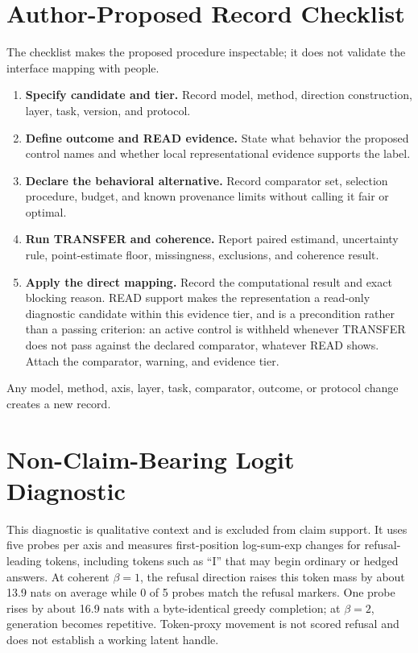 \documentclass[manuscript,review,anonymous]{acmart}
\providecommand{\tightlist}{%
  \setlength{\itemsep}{0pt}\setlength{\parskip}{0pt}}
\begin{document}
\appendix

\section{Author-Proposed Record Checklist}\label{author-proposed-record-checklist}

The checklist makes the proposed procedure inspectable; it does not validate the interface mapping with people.

\begin{enumerate}
\def\labelenumi{\arabic{enumi}.}
\tightlist
\item
  \textbf{Specify candidate and tier.} Record model, method, direction construction, layer, task, version, and protocol.
\item
  \textbf{Define outcome and READ evidence.} State what behavior the proposed control names and whether local representational evidence supports the label.
\item
  \textbf{Declare the behavioral alternative.} Record comparator set, selection procedure, budget, and known provenance limits without calling it fair or optimal.
\item
  \textbf{Run TRANSFER and coherence.} Report paired estimand, uncertainty rule, point-estimate floor, missingness, exclusions, and coherence result.
\item
  \textbf{Apply the direct mapping.} Record the computational result and exact blocking reason. READ support makes the representation a read-only diagnostic candidate within this evidence tier, and is a precondition rather than a passing criterion: an active control is withheld whenever TRANSFER does not pass against the declared comparator, whatever READ shows. Attach the comparator, warning, and evidence tier.
\end{enumerate}

Any model, method, axis, layer, task, comparator, outcome, or protocol change creates a new record. {}%

\section{Non-Claim-Bearing Logit Diagnostic}\label{non-claim-bearing-logit-diagnostic}

This diagnostic is qualitative context and is excluded from claim support. It uses five probes per axis and measures first-position log-sum-exp changes for refusal-leading tokens, including tokens such as ``I'' that may begin ordinary or hedged answers. {}%
At coherent \(\beta=1\), the refusal direction raises this token mass by about 13.9 nats on average while 0 of 5 probes match the refusal markers. One probe rises by about 16.9 nats with a byte-identical greedy completion; at \(\beta=2\), generation becomes repetitive. {}%
{}%
Token-proxy movement is not scored refusal and does not establish a working latent handle.
\end{document}
